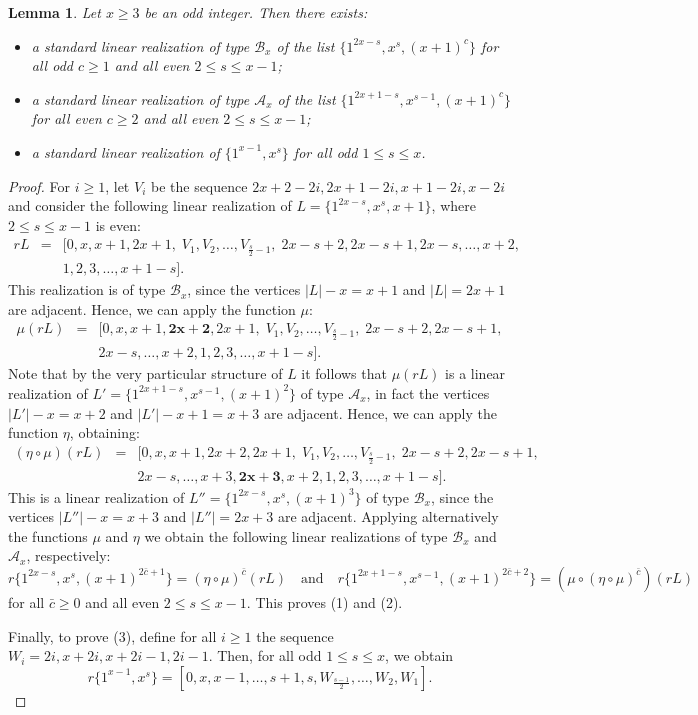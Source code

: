 \documentclass{amsart}
\newtheorem{lem}[prop]{Lemma}
\theoremstyle{definition}
\numberwithin{equation}{section}
\def\A{\mathcal{A}}
\def\B{\mathcal{B}}
\def\equad{\quad \textrm{and} \quad}
\begin{document}
\begin{lem}\label{odd2}
Let $x\geq 3$ be an odd integer. Then there exists:
\begin{itemize}
\item[(1)] a standard linear realization of type $\B_x$ of the list $\{1^{2x-s}, x^s, (x+1)^c\}$ for all odd $c\geq 1$
and all even $2\leq  s\leq x-1$;
\item[(2)] a standard linear realization of type $\A_x$ of the list $\{1^{2x+1-s}, x^{s-1}, (x+1)^c\}$ for all even $c\geq
2$  and all even $2\leq  s\leq x-1$;
\item[(3)] a standard linear realization of $\{1^{x-1 }, x^s\}$ for all odd $1\leq  s\leq x$.
\end{itemize}
\end{lem}

\begin{proof}
For $i\geq 1$, let $V_i$ be the sequence $2x+2-2i, 2x+1-2i, x+1-2i, x-2i$ and  consider the following linear
realization of $L=\{1^{2x-s}, x^s, x+1\}$, where $2\leq s\leq x-1$ is even:
$$\begin{array}{rcl}
rL & =& [0,x,x+1, 2x+1,\;  V_1,V_2,\ldots,V_{\frac{s}{2}-1},\;2x-s+2,2x-s+1,2x-s,\ldots, x+2,\\
&& 1,2,3,\ldots,x+1-s].
  \end{array}$$
This realization is of type $\B_x$, since the vertices $|L|-x = x+1$ and $|L|=2x+1$ are adjacent. Hence,
we  can apply the function $\mu$:
$$\begin{array}{rcl}
\mu(rL) & =& [0,x,x+1,\bm{2x+2}, 2x+1,\;  V_1,V_2,\ldots,V_{\frac{s}{2}-1},\;2x-s+2,2x-s+1,\\
&& 2x-s,\ldots, x+2, 1,2,3,\ldots,x+1-s].
  \end{array}$$
Note that by the very particular structure of $L$ it follows that $\mu(rL)$ is a linear realization
 of $L'=\{1^{2x+1-s}, x^{s-1}, (x+1)^2\}$ of type $\A_x$, in fact the vertices $|L'|-x=x+2$ and
 $|L'|-x+1=x+3$ are adjacent.
Hence, we can apply the function $\eta$, obtaining:
 $$\begin{array}{rcl}
 (\eta\circ\mu)(rL ) &= &  [0,x,x+1,2x+2, 2x+1,\;  V_1,V_2,\ldots,V_{\frac{s}{2}-1},\;2x-s+2,2x-s+1,\\
&& 2x-s,\ldots, x+3, \bm{2x+3}, x+2, 1,2,3,\ldots,x+1-s].
 \end{array}$$
This is a linear realization  of $L''=\{1^{2x-s}, x^{s}, (x+1)^3\}$ of type $\B_x$, since
the vertices $|L''|-x=x+3$ and $|L''|=2x+3$ are adjacent.
Applying alternatively the functions $\mu$ and $\eta$ we obtain the following linear realizations of type
$\B_x$ and $\A_x$, respectively:
$$r\{1^{2x-s}, x^s, (x+1)^{2\bar c+1} \}=(\eta \circ \mu)^{\bar c} (rL)\equad r\{1^{2x+1-s}, x^{s-1}, (x+1)^{2\bar
c+2}\}=(\mu\circ(\eta\circ\mu)^{\bar c} )(rL )$$
for all $\bar c\geq 0$ and all even $2\leq s\leq x-1$. This proves (1) and (2).

Finally, to prove (3),  define for all $i\geq 1$ the sequence
$W_i=2i,x+2i,x+2i-1, 2i-1$.
Then, for all odd $1\leq  s\leq x$, we obtain
$$r\{1^{x-1},x^s\}=[0,x,x-1,\ldots,s+1,s,W_{\frac{s-1}{2}},\ldots,W_2,W_1].$$
\end{proof}
\end{document}
